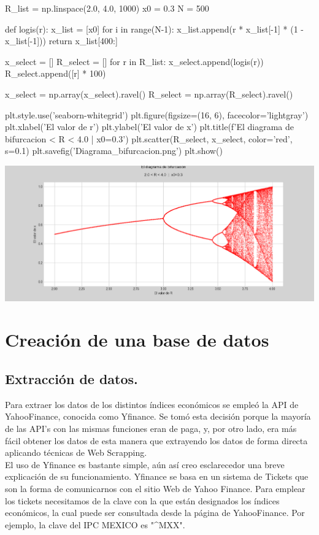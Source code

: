 \documentclass[10pt,a4paper]{article}
\begin{document}
\begin{python}
R_list = np.linspace(2.0, 4.0, 1000)
x0 = 0.3
N = 500

def logis(r):
    x_list = [x0]    
    for i in range(N-1):
        x_list.append(r * x_list[-1] * (1 - x_list[-1]))
    return x_list[400:]

x_select = []
R_select = []
for r in R_list:
    x_select.append(logis(r))
    R_select.append([r] * 100) 
    
x_select = np.array(x_select).ravel()
R_select = np.array(R_select).ravel()

plt.style.use('seaborn-whitegrid')
plt.figure(figsize=(16, 6), facecolor='lightgray')
plt.xlabel('El valor de r')
plt.ylabel('El valor de x')
plt.title(f'\n El diagrama de bifurcacion \n{} < R < 4.0  |  x0=0.3\n')
plt.scatter(R_select, x_select, color='red', s=0.1)
plt.savefig('Diagrama_bifurcacion.png')
plt.show()
\end{python}

\includegraphics[scale=0.5]{Diagram_bif.png} 

\section{Creación de una base de datos}

	\subsection{Extracción de datos.}

		Para extraer los datos de los distintos índices económicos se empleó la API de YahooFinance, conocida como Yfinance. Se tomó esta decisión porque la mayoría de las API's con las mismas funciones eran de paga, y, por otro lado, era más fácil obtener los datos de esta manera que extrayendo los datos de forma directa aplicando técnicas de Web Scrapping. \\
		
		El uso de Yfinance es bastante simple, aún así creo esclarecedor una breve explicación de su funcionamiento. Yfinance se basa en un sistema de Tickets que son la forma de comunicarnos con el sitio Web de Yahoo Finance. Para emplear los tickets necesitamos de la clave con la que están designados los índices económicos, la cual puede ser consultada desde la página de YahooFinance. Por ejemplo, la clave del IPC MEXICO es "\^{}MXX". \\
		
\end{document}
